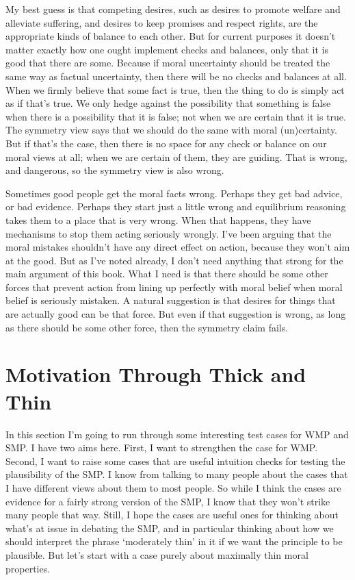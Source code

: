\documentclass[
  10pt,
  letterpaper,
  twoside]{scrbook}
\begin{document}
My best guess is that competing desires, such as desires to promote
welfare and alleviate suffering, and desires to keep promises and
respect rights, are the appropriate kinds of balance to each other. But
for current purposes it doesn't matter exactly how one ought implement
checks and balances, only that it is good that there are some. Because
if moral uncertainty should be treated the same way as factual
uncertainty, then there will be no checks and balances at all. When we
firmly believe that some fact is true, then the thing to do is simply
act as if that's true. We only hedge against the possibility that
something is false when there is a possibility that it is false; not
when we are certain that it is true. The symmetry view says that we
should do the same with moral (un)certainty. But if that's the case,
then there is no space for any check or balance on our moral views at
all; when we are certain of them, they are guiding. That is wrong, and
dangerous, so the symmetry view is also wrong.

Sometimes good people get the moral facts wrong. Perhaps they get bad
advice, or bad evidence. Perhaps they start just a little wrong and
equilibrium reasoning takes them to a place that is very wrong. When
that happens, they have mechanisms to stop them acting seriously
wrongly. I've been arguing that the moral mistakes shouldn't have any
direct effect on action, because they won't aim at the good. But as I've
noted already, I don't need anything that strong for the main argument
of this book. What I need is that there should be some other forces that
prevent action from lining up perfectly with moral belief when moral
belief is seriously mistaken. A natural suggestion is that desires for
things that are actually good can be that force. But even if that
suggestion is wrong, as long as there should be some other force, then
the symmetry claim fails.

\section{Motivation Through Thick and
Thin}\label{motivationthroughthickandthin}

In this section I'm going to run through some interesting test cases for
WMP and SMP. I have two aims here. First, I want to strengthen the case
for WMP. Second, I want to raise some cases that are useful intuition
checks for testing the plausibility of the SMP. I know from talking to
many people about the cases that I have different views about them to
most people. So while I think the cases are evidence for a fairly strong
version of the SMP, I know that they won't strike many people that way.
Still, I hope the cases are useful ones for thinking about what's at
issue in debating the SMP, and in particular thinking about how we
should interpret the phrase `moderately thin' in it if we want the
principle to be plausible. But let's start with a case purely about
maximally thin moral properties.
\end{document}
